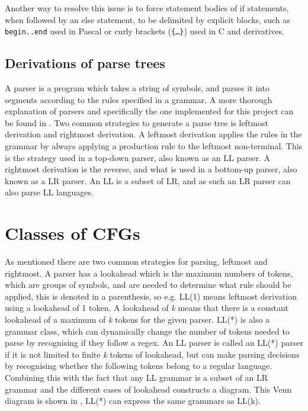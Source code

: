 Another way to resolve this issue is to force statement bodies of if statements, when followed by an else statement, to be delimited by explicit blocks, such as \texttt{begin..end} used in Pascal or curly brackets (\texttt{\{\ldots\}}) used in C and derivatives. 

\subsection{Derivations of parse trees}\label{sec:parsetrees}
A parser is a program which takes a string of symbols, and parses it into segments according to the rules specified in a grammar.
A more thorough explanation of parsers and specifically the one implemented for this project can be found in .
Two common strategies to generate a parse tree is leftmost derivation and rightmost derivation. 
A leftmost derivation applies the rules in the grammar by always applying a production rule to the leftmost non-terminal. 
This is the strategy used in a top-down parser, also known as an LL parser.
A rightmost derivation is the reverse, and what is used in a bottom-up parser, also known as a LR parser.
An LL is a subset of LR, and as such an LR parser can also parse LL languages. 

\section{Classes of CFGs}
As mentioned there are two common strategies for parsing, leftmost and rightmost. 
A parser has a lookahead which is the maximum numbers of tokens, which are groups of symbols, and are needed to determine what rule should be applied, this is denoted in a parenthesis, so e.g. LL(1) means leftmost derivation using a lookahead of 1 token.
A lookahead of \emph{k} means that there is a constant lookahead of a maximum of \emph{k} tokens for the given parser. 
LL(*) is also a grammar class, which can dynamically change the number of tokens needed to parse by recognising if they follow a \acrlong{regex}.
An LL parser is called an LL(*) parser if it is not limited to finite \emph{k} tokens of lookahead, but can make parsing decisions by recognising whether the following tokens belong to a regular language.
Combining this with the fact that any LL grammar is a subset of an LR grammar and the different cases of lookahead constructs a diagram. 
This Venn diagram is shown in , LL(*) can express the same grammars as LL(k).

